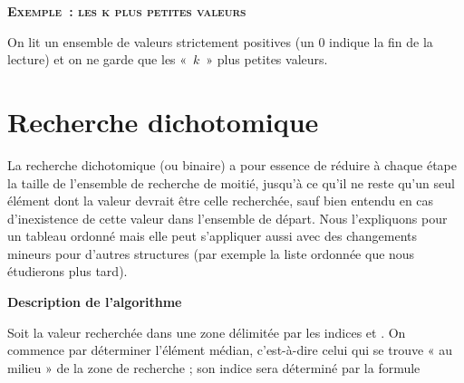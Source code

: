 	{\sffamily\bfseries\scshape
	Exemple~: les k plus petites valeurs}

		On lit un ensemble de valeurs strictement positives (un 0 indique la fin
		de la lecture) et on ne garde que les «~$k$~» plus petites valeurs.

		\bigskip
		
		

\section{Recherche dichotomique}

	La recherche dichotomique (ou binaire) a pour essence de réduire à
	chaque étape la taille de l’ensemble de recherche de moitié, jusqu’à ce
	qu’il ne reste qu’un seul élément dont la valeur devrait être celle
	recherchée, sauf bien entendu en cas d’inexistence de cette valeur dans
	l’ensemble de départ. Nous l’expliquons pour un tableau ordonné mais
	elle peut s’appliquer aussi avec des changements mineurs pour
	d'autres structures (par exemple la liste ordonnée que
	nous étudierons plus tard).

	{\sffamily\bfseries\upshape
	Description de l’algorithme}

	Soit  la valeur recherchée dans une zone
	délimitée par les indices  et
	. On commence par déterminer l’élément
	médian, c’est-à-dire celui qui se trouve « au milieu » de la zone de
	recherche ; son indice sera déterminé par la formule

